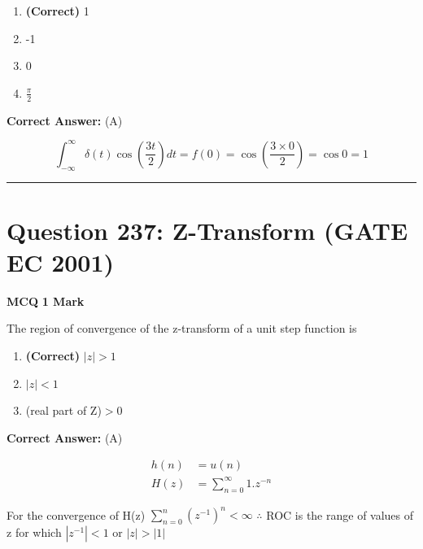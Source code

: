 \documentclass[11pt,a4paper]{article}
\begin{document}
\begin{enumerate}[label=(\Alph*)]
    \item \textbf{(Correct)} 1
    \item -1
    \item 0
    \item $\frac{\pi }{2}$
\end{enumerate}

\noindent \textbf{Correct Answer:} (A)

\begin{tcolorbox}[solbox, title=Detailed Solution -- Question 236]
\[
\int_{-\infty}^{\infty} \delta(t) \cos \left(\frac{3 t}{2}\right) d t=f(0)=\cos \left(\frac{3 \times 0}{2}\right)=\cos 0=1
\]
\end{tcolorbox}

\vspace{1.5em}
\hrule
\vspace{1.5em}

\section*{Question 237: Z-Transform (GATE EC 2001)}
\noindent \textbf{\color{primary}MCQ} \hfill \textbf{\color{secondary}1 Mark}


\noindent The region of convergence of the z-transform of a unit step function is


\begin{enumerate}[label=(\Alph*)]
    \item \textbf{(Correct)} $\mid z\mid > 1$
    \item $\mid z\mid < 1$
    \item (real part of Z)$>$0
\end{enumerate}

\noindent \textbf{Correct Answer:} (A)

\begin{tcolorbox}[solbox, title=Detailed Solution -- Question 237]
\[
\begin{aligned} h(n)&=u(n) \\ H(z)&=\sum_{n=0}^{\infty} 1 . z^{-n} \end{aligned}
\]

 For the convergence of H(z) 
$\sum_{n=0}^{n}\left(z^{-1}\right)^{n}< \infty$
 $\therefore$ ROC is the range of values of z for which 
$\left|z^{-1}\right| < 1\text{ or } |z|> |1|$
\end{tcolorbox}
\end{document}
